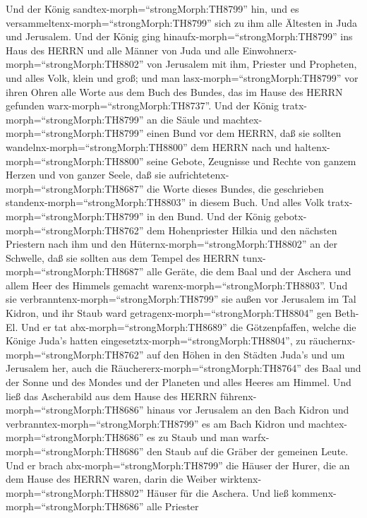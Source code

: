  Und der König sandtex-morph=``strongMorph:TH8799'' hin, und
es versammeltenx-morph=``strongMorph:TH8799'' sich zu ihm alle Ältesten
in Juda und Jerusalem.  Und der König ging
hinaufx-morph=``strongMorph:TH8799'' ins Haus des HERRN und alle Männer
von Juda und alle Einwohnerx-morph=``strongMorph:TH8802'' von Jerusalem
mit ihm, Priester und Propheten, und alles Volk, klein und groß; und man
lasx-morph=``strongMorph:TH8799'' vor ihren Ohren alle Worte aus dem
Buch des Bundes, das im Hause des HERRN gefunden
warx-morph=``strongMorph:TH8737''.  Und der König
tratx-morph=``strongMorph:TH8799'' an die Säule und
machtex-morph=``strongMorph:TH8799'' einen Bund vor dem HERRN, daß sie
sollten wandelnx-morph=``strongMorph:TH8800'' dem HERRN nach und
haltenx-morph=``strongMorph:TH8800'' seine Gebote, Zeugnisse und Rechte
von ganzem Herzen und von ganzer Seele, daß sie
aufrichtetenx-morph=``strongMorph:TH8687'' die Worte dieses Bundes, die
geschrieben standenx-morph=``strongMorph:TH8803'' in diesem Buch. Und
alles Volk tratx-morph=``strongMorph:TH8799'' in den Bund. 
Und der König gebotx-morph=``strongMorph:TH8762'' dem Hohenpriester
Hilkia und den nächsten Priestern nach ihm und den
Hüternx-morph=``strongMorph:TH8802'' an der Schwelle, daß sie sollten
aus dem Tempel des HERRN tunx-morph=``strongMorph:TH8687'' alle Geräte,
die dem Baal und der Aschera und allem Heer des Himmels gemacht
warenx-morph=``strongMorph:TH8803''. Und sie
verbranntenx-morph=``strongMorph:TH8799'' sie außen vor Jerusalem im Tal
Kidron, und ihr Staub ward getragenx-morph=``strongMorph:TH8804'' gen
Beth-El.  Und er tat abx-morph=``strongMorph:TH8689'' die
Götzenpfaffen, welche die Könige Juda's hatten
eingesetztx-morph=``strongMorph:TH8804'', zu
räuchernx-morph=``strongMorph:TH8762'' auf den Höhen in den Städten
Juda's und um Jerusalem her, auch die
Räuchererx-morph=``strongMorph:TH8764'' des Baal und der Sonne und des
Mondes und der Planeten und alles Heeres am Himmel.  Und
ließ das Ascherabild aus dem Hause des HERRN
führenx-morph=``strongMorph:TH8686'' hinaus vor Jerusalem an den Bach
Kidron und verbranntex-morph=``strongMorph:TH8799'' es am Bach Kidron
und machtex-morph=``strongMorph:TH8686'' es zu Staub und man
warfx-morph=``strongMorph:TH8686'' den Staub auf die Gräber der gemeinen
Leute.  Und er brach abx-morph=``strongMorph:TH8799'' die
Häuser der Hurer, die an dem Hause des HERRN waren, darin die Weiber
wirktenx-morph=``strongMorph:TH8802'' Häuser für die Aschera.
 Und ließ kommenx-morph=``strongMorph:TH8686'' alle Priester
